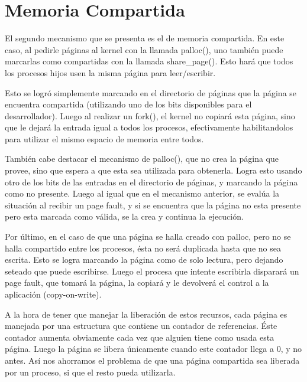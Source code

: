 \section{Memoria Compartida}

El segundo mecanismo que se presenta es el de memoria compartida. En este caso,
al pedirle páginas al kernel con la llamada palloc(), uno también puede
marcarlas como compartidas con la llamada share\_page(). Esto hará que todos
los procesos hijos usen la misma página para leer/escribir.

Esto se logró simplemente marcando en el directorio de páginas que la página se
encuentra compartida (utilizando uno de los bits disponibles para el
desarrollador). Luego al realizar un fork(), el kernel no copiará esta página,
sino que le dejará la entrada igual a todos los procesos, efectivamente
habilitandolos para utilizar el mismo espacio de memoria entre todos.

También cabe destacar el mecanismo de palloc(), que no crea la página que
provee, sino que espera a que esta sea utilizada para obtenerla. Logra esto
usando otro de los bits de las entradas en el directorio de páginas, y marcando
la página como no presente. Luego al igual que en el mecanismo anterior, se
evalúa la situación al recibir un page fault, y si se encuentra que la página
no esta presente pero esta marcada como válida, se la crea y continua la
ejecución.

Por último, en el caso de que una página se halla creado con palloc, pero no se
halla compartido entre los procesos, ésta no será duplicada hasta que no sea
escrita. Esto se logra marcando la página como de solo lectura, pero dejando
seteado que puede escribirse. Luego el procesa que intente escribirla disparará
un page fault, que tomará la página, la copiará y le devolverá el control a la
aplicación (copy-on-write).

A la hora de tener que manejar la liberación de estos recursos, cada página es
manejada por una estructura que contiene un contador de referencias. Éste
contador aumenta obviamente cada vez que alguien tiene como usada esta página.
Luego la página se libera únicamente cuando este contador llega a 0, y no
antes. Así nos ahorramos el problema de que una página compartida sea liberada
por un proceso, si que el resto pueda utilizarla.

